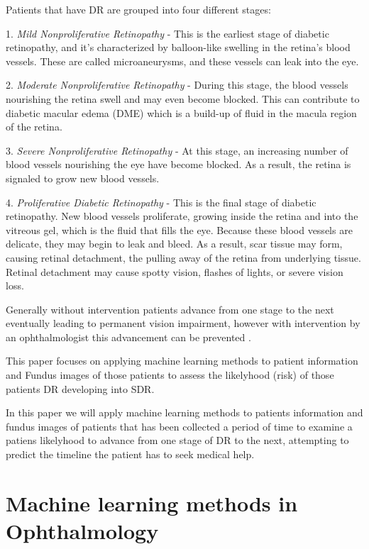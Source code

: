 Patients that have DR are grouped into four different stages\cite{Intro_FourStages}:

1. \textit{Mild Nonproliferative Retinopathy} - This is the earliest stage of diabetic retinopathy, and it’s characterized by balloon-like swelling in the retina’s blood vessels. These are called microaneurysms, and these vessels can leak into the eye.

2. \textit{Moderate Nonproliferative Retinopathy} - During this stage, the blood vessels nourishing the retina swell and may even become blocked. This can contribute to diabetic macular edema (DME) which is a build-up of fluid in the macula region of the retina.

3. \textit{Severe Nonproliferative Retinopathy} -  At this stage, an increasing number of blood vessels nourishing the eye have become blocked. As a result, the retina is signaled to grow new blood vessels.

4. \textit{Proliferative Diabetic Retinopathy} - This is the final stage of diabetic retinopathy. New blood vessels proliferate, growing inside the retina and into the vitreous gel, which is the fluid that fills the eye. Because these blood vessels are delicate, they may begin to leak and bleed. As a result, scar tissue may form, causing retinal detachment, the pulling away of the retina from underlying tissue. Retinal detachment may cause spotty vision, flashes of lights, or severe vision loss.

Generally without intervention patients advance from one stage to the next eventually leading 
to permanent vision impairment, however with intervention by an ophthalmologist this advancement 
can be prevented \cite{Intro_StageAdvancement}. 

This paper focuses on applying machine learning methods to patient information and Fundus images of those 
patients to assess the likelyhood (risk) of those patients DR developing into SDR.

In this paper we will apply machine learning methods to patients information and fundus images of patients 
that has been collected a period of time to examine a patiens likelyhood to advance from one stage 
of DR to the next, attempting to predict the timeline the patient has to seek medical help. 

\section{Machine learning methods in Ophthalmology}

